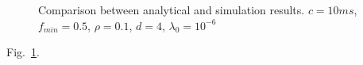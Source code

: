 \begin{figure}[!t]
	\begin{center}
	\end{center}
	\caption{Comparison between analytical and simulation results. $c=10ms$, $f_{min}=0.5$, $\rho=0.1$, $d=4$, $\lambda_0=10^{-6}$}
	\label{fig:comparison_analytical_sim}
\end{figure}


Fig.~\ref{fig:comparison_analytical_sim}.


